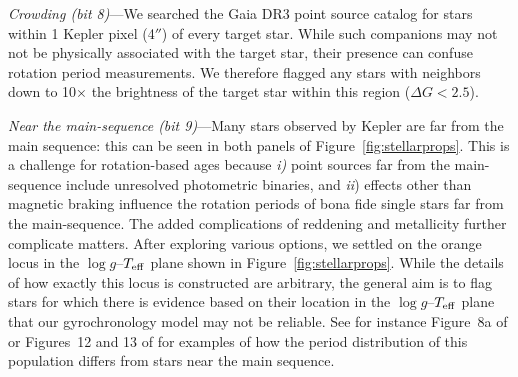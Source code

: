 \documentclass[11pt,twocolumn,tighten]{aastex63}
\begin{document}
{\it Crowding (bit 8)}---We searched the Gaia DR3 point source catalog
for stars within 1 Kepler pixel (4$''$) of every target star.  While
such companions may not not be physically associated with the target
star, their presence can confuse rotation period measurements.  We
therefore flagged any stars with neighbors down to 10$\times$ the
brightness of the target star within this region ($\Delta G < 2.5$).

{\it Near the main-sequence (bit 9)}---Many stars observed by Kepler
are far from the main sequence: this can be seen in both panels of
Figure~\ref{fig:stellarprops}.  This is a challenge for rotation-based
ages because {\it i)} point sources far from the main-sequence include
unresolved photometric binaries, and {\it ii}) effects other than
magnetic braking influence the rotation periods of bona fide single
stars far from the main-sequence.  The added complications of
reddening and metallicity further complicate matters.  After exploring
various options, we settled on the orange locus in the $\log
g$--$T_{\rm eff}$ plane shown in Figure~\ref{fig:stellarprops}.  While
the details of how exactly this locus is constructed are arbitrary, 
the general aim is to flag stars for which there is evidence based on
their location in the $\log g$--$T_{\rm eff}$ plane that our
gyrochronology model may not be reliable.  
See for instance Figure~8a of \citet{2022AJ....164..137K} or
Figures~12 and 13 of \citet{2023ApJS..268....4F} for examples of how
the period distribution of this population differs from stars near the
main sequence.
\end{document}
